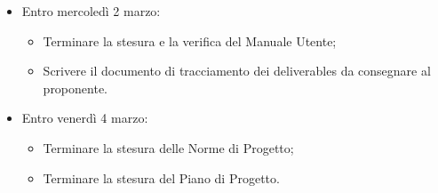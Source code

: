 \begin{itemize}
    \item Entro mercoledì 2 marzo:
    \begin{itemize}
        \item Terminare la stesura e la verifica del Manuale Utente;
        \item Scrivere il documento di tracciamento dei deliverables da consegnare al proponente.
    \end{itemize}
    \item Entro venerdì 4 marzo:
    \begin{itemize}
        \item Terminare la stesura delle Norme di Progetto;
        \item Terminare la stesura del Piano di Progetto.
    \end{itemize}
\end{itemize}